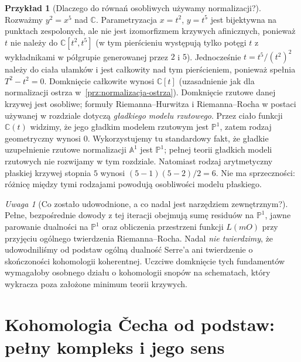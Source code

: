 \documentclass[11pt,a4paper,openany]{report}
\numberwithin{equation}{section}
\theoremstyle{plain}
\theoremstyle{definition}
\newtheorem{przyklad}[twierdzenie]{Przykład}
\theoremstyle{remark}
\newtheorem{uwaga}[twierdzenie]{Uwaga}
\newcommand{\C}{\mathbb C}
\newcommand{\A}{\mathbb A}
\newcommand{\PP}{\mathbb P}
\begin{document}
\begin{przyklad}[Dlaczego do równań osobliwych używamy normalizacji?]
Rozważmy $y^2=x^5$ nad $\C$.
Parametryzacja $x=t^2$, $y=t^5$ jest bijektywna
na punktach zespolonych, ale nie jest izomorfizmem
krzywych afinicznych, ponieważ $t$ nie należy do
$\C[t^2,t^5]$ (w tym pierścieniu występują tylko potęgi
$t$ z wykładnikami w półgrupie generowanej przez $2$ i $5$).
Jednocześnie $t=t^5/(t^2)^2$ należy do ciała ułamków i jest
całkowity nad tym pierścieniem, ponieważ spełnia
$T^2-t^2=0$. Domknięcie całkowite wynosi $\C[t]$
(uzasadnienie jak dla normalizacji ostrza w~\ref{prz:normalizacja-ostrza}).
Domknięcie rzutowe danej krzywej jest osobliwe;
formuły Riemanna--Hurwitza i Riemanna--Rocha
w postaci używanej w rozdziale dotyczą \emph{gładkiego
modelu rzutowego}. Przez ciało funkcji $\C(t)$ widzimy,
że jego gładkim modelem rzutowym jest $\PP^1$,
zatem rodzaj geometryczny wynosi $0$. Wykorzystujemy tu
standardowy fakt, że gładkie uzupełnienie rzutowe
normalizacji $\A^1$ jest $\PP^1$; pełnej teorii
gładkich modeli rzutowych nie rozwijamy w tym rozdziale.
Natomiast rodzaj arytmetyczny płaskiej krzywej
stopnia $5$ wynosi $(5-1)(5-2)/2=6$.
Nie ma sprzeczności: różnicę między tymi
rodzajami powodują osobliwości modelu płaskiego.
\end{przyklad}

\begin{uwaga}[Co zostało udowodnione, a co nadal jest narzędziem zewnętrznym?]
Pełne, bezpośrednie dowody z tej iteracji obejmują
sumę residuów na $\PP^1$, jawne parowanie dualności
na $\PP^1$ oraz obliczenia przestrzeni funkcji
$L(mO)$ przy przyjęciu ogólnego twierdzenia
Riemanna--Rocha. Nadal \emph{nie twierdzimy}, że
udowodniliśmy od podstaw ogólną dualność Serre'a
ani twierdzenie o skończoności kohomologii koherentnej.
Uczciwe domknięcie tych fundamentów wymagałoby
osobnego działu o kohomologii snopów na schematach,
który wykracza poza założone minimum teorii krzywych.
\end{uwaga}

\section{Kohomologia Čecha od podstaw: pełny kompleks i jego sens}
\label{sec:cech-full}
\end{document}
